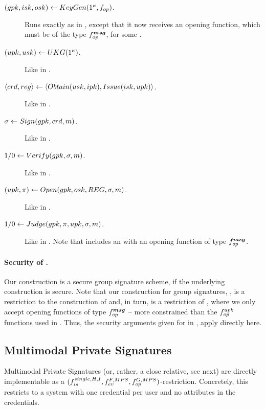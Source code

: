 \begin{description}
\item[$(gpk,isk,osk) \gets KeyGen(1^\kappa,f_{op})$.] Runs exactly as in
  \CUASGS, except that it now receives an opening function, which must be of
  the type $f_{op}^{\boldsymbol{msg}}$, for some \smsg.
\item[$(upk,usk) \gets UKG(1^\kappa)$.] Like in \CUASGS.  
\item[$\langle crd,reg \rangle \gets
  \langle Obtain(usk,ipk),Issue(isk,upk)\rangle$.] Like in \CUASGS.
\item[$\sigma \gets Sign(gpk,crd,m)$.] Like in \CUASGS.
\item[$1/0 \gets Verify(gpk,\sigma,m)$.] Like in \CUASGS.
\item[$(\upk,\pi) \gets \Open(\gpk,\osk,\trans,\sig,\msg)$.] Like in
  \CUASGS.
\item[$1/0 \gets Judge(gpk,\pi,upk,\sigma,m)$.] Like in \CUASGen. Note that
  \gpk includes an \opk with an opening function of type $f_{op}^{\boldsymbol{msg}}$.
\end{description}

\paragraph{Security of \CUASGSMDO.} %
Our \CUASGSMDO construction is a secure group signature scheme, if the
underlying \CUASGen construction is secure.
%
Note that our construction for group signatures, \CUASGS, is a restriction to
the construction of \CUASGen and, in turn, \CUASGSMDO is a restriction of
\CUASGS, where we only accept opening functions of type $f_{op}^{\boldsymbol{msg}}$ --
more constrained than the $f_{op}^{upk}$ functions used in \CUASGS. Thus, the
security arguments given for \CUASGS in , apply
directly here.

\subsection{Multimodal Private Signatures}
\label{ssec:related-models-mps}

Multimodal Private Signatures (or, rather, a close relative, see next) are
directly implementable as a $(f_{is}^{single,H,I},f_{ev}^{F,MPS},
f_{op}^{G,MPS})$-\CUASGen restriction. Concretely, this restricts to a \UAS
system with one credential per user and no attributes in the credentials.


